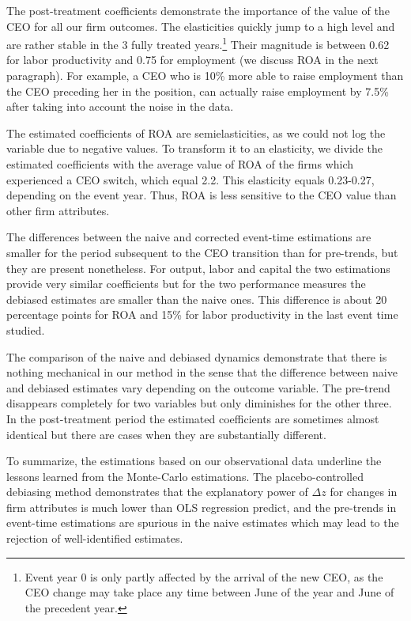 \documentclass[sigconf,nonacm]{acmart}
\begin{document}
The post-treatment coefficients demonstrate the importance of the value of the CEO for all our firm outcomes. The elasticities quickly jump to a high level and are rather stable in the 3 fully treated years.\footnote{Event year 0 is only partly affected by the arrival of the new CEO, as the CEO change may take place any time between June of the year and June of the precedent year.} Their magnitude is between 0.62 for labor productivity and 0.75 for employment (we discuss ROA in the next paragraph). For example, a CEO who is 10\% more able to raise employment than the CEO preceding her in the position, can actually raise employment by 7.5\% after taking into account the noise in the data.

The estimated coefficients of ROA are semielasticities, as we could not log the variable due to negative values. To transform it to an elasticity, we divide the estimated coefficients with the average value of ROA of the firms which experienced a CEO switch, which equal 2.2. This elasticity equals 0.23-0.27, depending on the event year. Thus, ROA is less sensitive to the CEO value than other firm attributes.

The differences between the naive and corrected event-time estimations are smaller for the period subsequent to the CEO transition than for pre-trends, but they are present nonetheless. For output, labor and capital the two estimations provide very similar coefficients but for the two performance measures the debiased estimates are smaller than the naive ones. This difference is about 20 percentage points for ROA and 15\% for labor productivity in the last event time studied.

The comparison of the naive and debiased dynamics demonstrate that there is nothing mechanical in our method in the sense that the difference between naive and debiased estimates vary depending on the outcome variable. The pre-trend disappears completely for two variables but only diminishes for the other three. In the post-treatment period the estimated coefficients are sometimes almost identical but there are cases when they are substantially different.

To summarize, the estimations based on our observational data underline the lessons learned from the Monte-Carlo estimations. The placebo-controlled debiasing method demonstrates that the explanatory power of $\Delta z$ for changes in firm attributes is much lower than OLS regression predict, and the pre-trends in event-time estimations are spurious in the naive estimates which may lead to the rejection of well-identified estimates.
\end{document}
